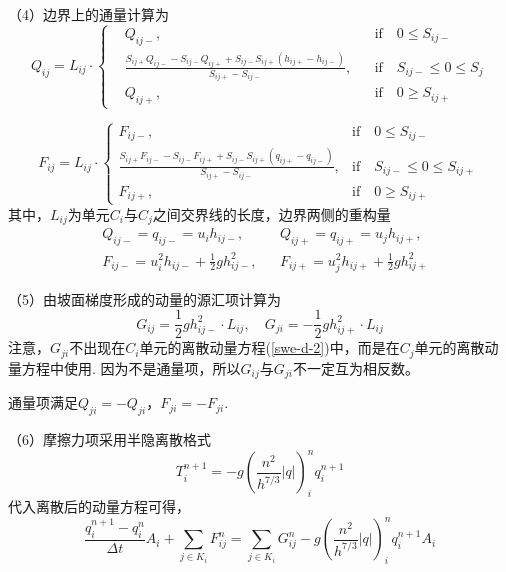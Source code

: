 （4）边界上的通量计算为
\begin{equation}
	Q_{ij} = L_{ij} \cdot \left\{
	\begin{aligned}
		& Q_{ij-}, && \mbox{if} \quad 0\leqslant S_{ij-} \\
		& \frac{S_{ij+} Q_{ij-} - S_{ij-} Q_{ij+} + S_{ij-} S_{ij+} \left(h_{ij+} - h_{ij-}\right)}{S_{ij+}-S_{ij-}} , && \mbox{if} \quad S_{ij-} \leqslant 0\leqslant S_j\\
		& Q_{ij+}, && \mbox{if} \quad 0\geqslant S_{ij+}
	\end{aligned}\right.
\end{equation}

\begin{equation}
F_{ij} = L_{ij} \cdot 
\begin{cases}
	 F_{ij-}, & \mbox{if} \quad 0\leqslant S_{ij-} \\
	 \frac{S_{ij+} F_{ij-} - S_{ij-} F_{ij+} + S_{ij-} S_{ij+} \left(q_{ij+} - q_{ij-}\right)}{S_{ij+}-S_{ij-}} , & \mbox{if} \quad S_{ij-} \leqslant 0\leqslant S_{ij+}\\
	F_{ij+}, & \mbox{if} \quad 0\geqslant S_{ij+}
\end{cases}
\end{equation}
其中，$L_{ij}$为单元$C_i$与$C_j$之间交界线的长度，边界两侧的重构量
\begin{align*}
&Q_{ij-} = q_{ij-} = u_i h_{ij-},  && Q_{ij+} = q_{ij+} = u_j h_{ij+}, \\
&F_{ij-} = u_i^2h_{ij-}+\frac{1}{2}gh_{ij-}^2, && F_{ij+} = u_j^2h_{ij+}+\frac{1}{2}gh_{ij+}^2
\end{align*}

（5）由坡面梯度形成的动量的源汇项计算为~\citep{audusse2004scientificcomputing}
\begin{equation}
G_{ij} = \frac{1}{2}gh_{ij-}^2 \cdot L_{ij}, \quad
G_{ji}=-\frac{1}{2}g h_{ij+}^2 \cdot L_{ij}
\end{equation}
注意，$G_{ji}$不出现在$C_i$单元的离散动量方程(\ref{swe-d-2})中，而是在$C_j$单元的离散动量方程中使用. 因为不是通量项，所以$G_{ij}$与$G_{ji}$不一定互为相反数。

通量项满足$Q_{ji} = -Q_{ji}$，$F_{ji}=-F_{ji}$.

（6）摩擦力项采用半隐离散格式
\begin{equation}
T^{n+1}_i = -g \left(\frac{n^2}{h^{7/3}} \left|q\right|\right)^n_i q^{n+1}_i
\end{equation}
代入离散后的动量方程可得，
 \begin{equation}
 \frac{ q^{n+1}_i - q^n_i}{\Delta t} A_i + \sum_{j\in K_i} F^n_{ij} = \sum_{j\in K_i} G^n_{ij}  -g \left(\frac{n^2}{h^{7/3}} \left|q\right|\right)^n_i q^{n+1}_i  A_i 
  \end{equation}

